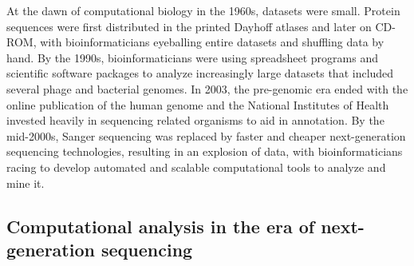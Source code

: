 \documentclass[ChapterTOCs,krantz2]{krantz} %
\begin{document}
At the dawn of computational biology in the 1960s, datasets were small.  
Protein sequences were first distributed in the printed Dayhoff atlases \cite{Strasser2010} and 
later on CD-ROM, with bioinformaticians eyeballing entire datasets and shuffling 
data by hand.  By the 1990s, bioinformaticians were using spreadsheet programs 
and scientific software packages to analyze increasingly large datasets that 
included several phage and bacterial genomes.  In 2003, the pre-genomic era ended 
with the online publication of the human genome\cite{Lander2001,Collins2003,HGP} and 
the National Institutes of Health invested heavily in sequencing related organisms to 
aid in annotation.  By the mid-2000s, Sanger sequencing was replaced 
by faster and cheaper next-generation sequencing technologies, 
resulting in an explosion of data, with bioinformaticians racing to develop 
automated and scalable computational tools
to analyze and mine it\cite{Ansorge2009}.



\subsection{Computational analysis in the era of next-generation sequencing}
\end{document}
